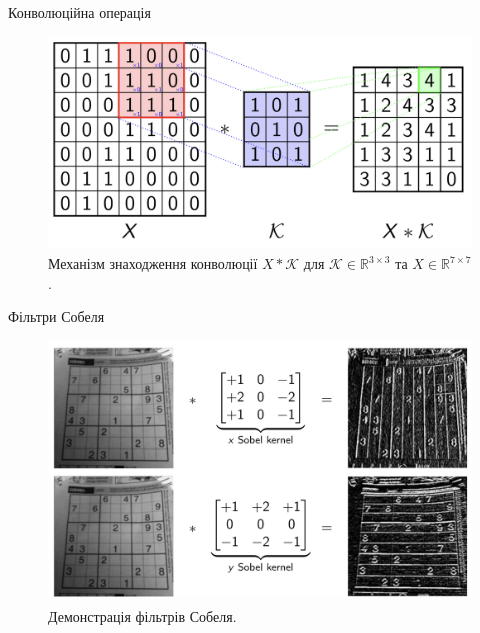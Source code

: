 \documentclass{zkdl-presentation-template}
\begin{document}
    \begin{frame}{Конволюційна операція}
        \begin{figure}
            \centering
            \includegraphics[width=\textwidth]{images/convolution.png}
            \caption{Механізм знаходження конволюції $X*\mathcal{K}$ для $\mathcal{K} \in \mathbb{R}^{3 \times 3}$ та $X \in \mathbb{R}^{7 \times 7}$.}
        \end{figure}
    \end{frame}

    \begin{frame}{Фільтри Собеля}
        \begin{figure}
            \centering
            \includegraphics[width=\textwidth]{images/sobel.png}
            \caption{Демонстрація фільтрів Собеля.}
        \end{figure}
    \end{frame}
    
\end{document}

